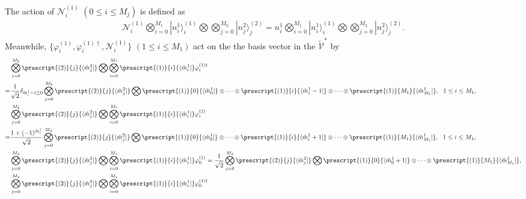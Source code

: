\documentclass[11pt,reqno]{amsart}
\numberwithin{equation}{section}
\begin{document}
	The action of $\mathcal{N}_i^{(1)}$ $(0\leq i\leq M_j)$ is defined as
	\begin{align}\label{right-eigenvalue}
		\mathcal{N}_i^{(1)}
		\bigotimes_{i=0}^{M_{1}}|n_{i}^{1} \rangle_{i}^{(1)}\bigotimes\bigotimes_{j=0}^{M_{2}}|n_{j}^{2}\rangle_{j}^{(2)}  	
		=n_{i}^{1}
		\bigotimes_{i=0}^{M_{1}}|n_{i}^{1} \rangle_{i}^{(1)}\bigotimes\bigotimes_{j=0}^{M_{2}}|n_{j}^{2}\rangle_{j}^{(2)} .
	\end{align}	
	Meanwhile,  $\{\varphi_i^{(1)},\varphi_i^{(1)\dagger}, \mathcal{N}_i^{(1)} \}$ $( 1\leq i\leq M_1)$  act on the the basis vector in the  $\tilde{\mathcal{V}}^{\ast}$  by
	\begin{align}
		&\bigotimes_{j=0}^{M_{2}}\prescript{(2)}{j}{\langle \tilde{m}^{2}_j|}\bigotimes
		\bigotimes_{i=0}^{M_{1}}\prescript{(1)}{i}{\langle \tilde{m}^{1}_i|}
		\varphi_i^{(1)\dagger}\notag\\
		=&\frac{1}{\sqrt{2}}  \delta_{\tilde{m}^{1}_i -1 \geq0}
		\bigotimes\limits_{j=0}^{M_{2}}\prescript{(2)}{j}{\langle \tilde{m}^{2}_j|}\bigotimes	
		\prescript{(1)}{0}{\langle \tilde{m}^{1}_0|}\otimes\cdots\otimes
		\prescript{(1)}{i}{\langle \tilde{m}^{1}_{i}-1|}
		\otimes\cdots\otimes\prescript{(1)}{M_1}{\langle \tilde{m}^{1}_{M_1}|},~~1\leq i\leq M_1,\label{left-ym}\\
		&\bigotimes_{j=0}^{M_{2}}\prescript{(2)}{j}{\langle \tilde{m}^{2}_j|}\bigotimes
		\bigotimes_{i=0}^{M_{1}}\prescript{(1)}{i}{\langle \tilde{m}^{1}_i|}
		\varphi_i^{(1)}\notag\\
		=&	\frac{1 + (-1)^{\tilde{m}_i^{1}}}{\sqrt{2}}
		\bigotimes\limits_{j=0}^{M_{2}}\prescript{(2)}{j}{\langle \tilde{m}^{2}_j|}\bigotimes	
		\prescript{(1)}{0}{\langle \tilde{m}^{1}_0|}\otimes\cdots\otimes
		\prescript{(1)}{i}{\langle \tilde{m}^{1}_{i}+1|}
		\otimes\cdots\otimes\prescript{(1)}{M_1}{\langle \tilde{m}^{1}_{M_1}|},~~1\leq i\leq M_1,\label{left-sc}\\
		&\bigotimes_{j=0}^{M_{2}}\prescript{(2)}{j}{\langle \tilde{m}^{2}_j|}\bigotimes
		\bigotimes_{i=0}^{M_{1}}\prescript{(1)}{i}{\langle \tilde{m}^{1}_i|}
		\varphi_0^{(1)}
		=\frac{1}{\sqrt{2}}
		\bigotimes\limits_{j=0}^{M_{2}}\prescript{(2)}{j}{\langle \tilde{m}^{2}_j|}\bigotimes
		\prescript{(1)}{0}{\langle \tilde{m}^{1}_0 +1|}\otimes\cdots\otimes\prescript{(1)}{M_1}{\langle \tilde{m}^{1}_{M_1}|},\label{left-sc0} \\
		&\bigotimes_{j=0}^{M_{2}}\prescript{(2)}{j}{\langle \tilde{m}^{2}_j|}\bigotimes
		\bigotimes_{i=0}^{M_{1}}\prescript{(1)}{i}{\langle \tilde{m}^{1}_i|}
		\varphi_0^{(1)\dagger}

\end{align}
\end{document}
